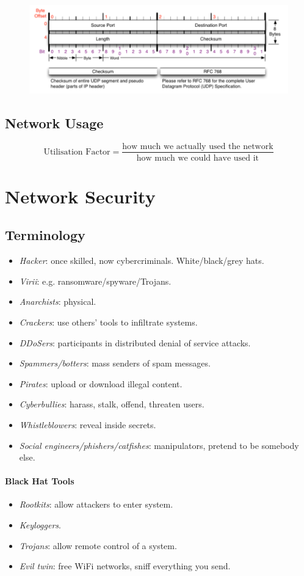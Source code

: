 \documentclass[twocolumn,english]{article}
\begin{document}
\begin{figure}[H]
\centering{}\includegraphics[width=0.75\linewidth]{img/udp}
\end{figure}

\subsection{Network Usage}

\[
\text{Utilisation Factor}=\frac{\text{how much we actually used the network}}{\text{how much we could have used it}}
\]

\section{Network Security}

\subsection{Terminology}
\begin{itemize}
\item \emph{Hacker}: once skilled, now cybercriminals. White/black/grey
hats.
\item \emph{Virii}: e.g. ransomware/spyware/Trojans.
\item \emph{Anarchists}: physical.
\item \emph{Crackers}: use others' tools to infiltrate systems.
\item \emph{DDoSers}: participants in distributed denial of service attacks.
\item \emph{Spammers/botters}: mass senders of spam messages.
\item \emph{Pirates}: upload or download illegal content.
\item \emph{Cyberbullies}: harass, stalk, offend, threaten users.
\item \emph{Whistleblowers}: reveal inside secrets.
\item \emph{Social engineers/phishers/catfishes}: manipulators, pretend
to be somebody else.
\end{itemize}

\paragraph{Black Hat Tools}
\begin{itemize}
\item \emph{Rootkits}: allow attackers to enter system.
\item \emph{Keyloggers}.
\item \emph{Trojans}: allow remote control of a system.
\item \emph{Evil twin}: free WiFi networks, sniff everything you send.
\end{itemize}
\end{document}
